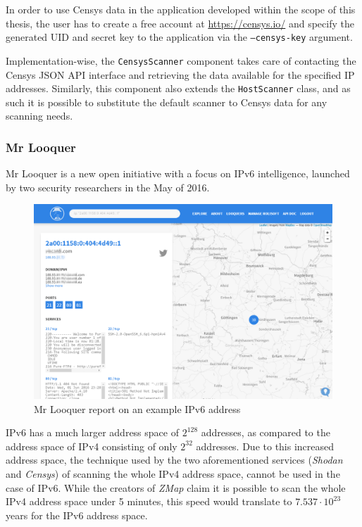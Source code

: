 \documentclass[a4paper,12pt]{article}
\begin{document}
	In order to use Censys data in the application developed within the scope of this thesis, the user has to create a free account at \url{https://censys.io/} and specify the generated UID and secret key to the application via the \texttt{--censys-key} argument.
		
	Implementation-wise, the \texttt{CensysScanner} component takes care of contacting the Censys JSON API interface and retrieving the data available for the specified IP addresses. Similarly, this component also extends the \texttt{HostScanner} class, and as such it is possible to substitute the default scanner to Censys data for any scanning needs.
	
\subsubsection{Mr Looquer} \label{looquer}
 

	Mr Looquer\cite{looquer16} is a new open initiative with a focus on IPv6 intelligence, launched by two security researchers in the May of 2016.
	
	\begin{figure}[!htbp]
		\centering
		\includegraphics[scale=0.355]{looquer.png}
		\caption{Mr Looquer report on an example IPv6 address}
		\label{looquerscr}
	\end{figure}
	
	IPv6 has a much larger address space of $ 2^{128} $ addresses, as compared to the address space of IPv4 consisting of only $ 2^{32} $ addresses. Due to this increased address space, the technique used by the two aforementioned services (\textit{Shodan} and \textit{Censys}) of scanning the whole IPv4 address space, cannot be used in the case of IPv6. While the creators of \textit{ZMap} claim it is possible to scan the whole IPv4 address space under 5 minutes\cite{zmap13}, this speed would translate to $ 7.537 \cdot 10^{23} $ years for the IPv6 address space.
	
\end{document}
